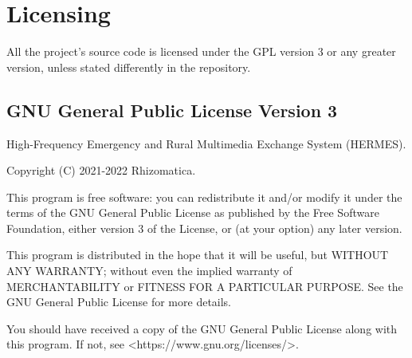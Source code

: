\documentclass[11pt,a4paper]{article}
\begin{document}
\section{Licensing}
\label{apx_license}

    All the project's source code is licensed under the GPL version 3 or any greater version, unless stated differently in the repository.

\subsection{GNU General Public License Version 3}

    High-Frequency Emergency and Rural Multimedia Exchange System (HERMES).

    Copyright (C) 2021-2022 Rhizomatica.
\newline

    This program is free software: you can redistribute it and/or modify
    it under the terms of the GNU General Public License as published by
    the Free Software Foundation, either version 3 of the License, or
    (at your option) any later version.

    This program is distributed in the hope that it will be useful,
    but WITHOUT ANY WARRANTY; without even the implied warranty of
    MERCHANTABILITY or FITNESS FOR A PARTICULAR PURPOSE.  See the
    GNU General Public License for more details.

    You should have received a copy of the GNU General Public License
    along with this program.  If not, see <https://www.gnu.org/licenses/>.
\end{document}
